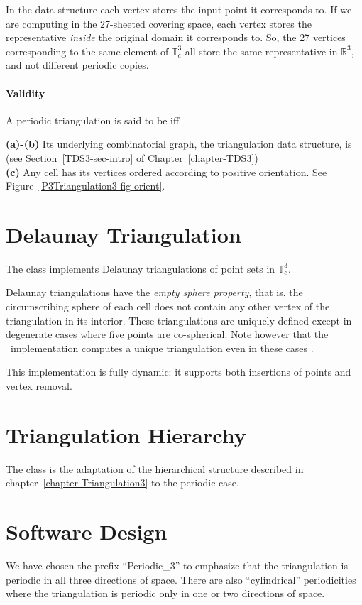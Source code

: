 In the data structure each vertex stores the input point it
corresponds to. If we are computing in the 27-sheeted covering 
space, each vertex stores the representative \emph{inside} the
original domain it corresponds to. So, the 27 vertices corresponding
to the same element of $\mathbb T_c^3$ all store the same
representative in $\mathbb R^3$, and not different periodic copies.

\paragraph{Validity}
A periodic triangulation is said to be  iff

{\bf (a)-(b)} Its underlying combinatorial graph, the triangulation
data structure, is  
(see Section~\ref{TDS3-sec-intro} of Chapter~\ref{chapter-TDS3})\\
{\bf (c)} Any cell has its vertices ordered according to positive
orientation. See Figure~\ref{P3Triangulation3-fig-orient}.

\section{Delaunay Triangulation} 
The class  implements Delaunay
triangulations of point sets in $\mathbb T_c^3$.

Delaunay triangulations have the \textit{empty sphere property},
that is, the circumscribing sphere of each cell does not contain any
other vertex of the triangulation in its interior. These
triangulations are uniquely defined except in degenerate cases where
five points are co-spherical.  Note however that the \cgal\
implementation computes a unique triangulation even in these cases
\cite{cgal:dt-pvr3d-03}.

This implementation is fully dynamic: it supports both insertions of
points and vertex removal.

\section{Triangulation Hierarchy}
The class  is the adaptation
of the hierarchical structure described in
chapter~\ref{chapter-Triangulation3} to the periodic case.

\section{Software Design\label{P3Triangulation3-sec-design}}
We have chosen the prefix ``Periodic\_3'' to emphasize that the
triangulation is periodic in all three directions of space. There are
also ``cylindrical'' periodicities where the triangulation is periodic
only in one or two directions of space.

